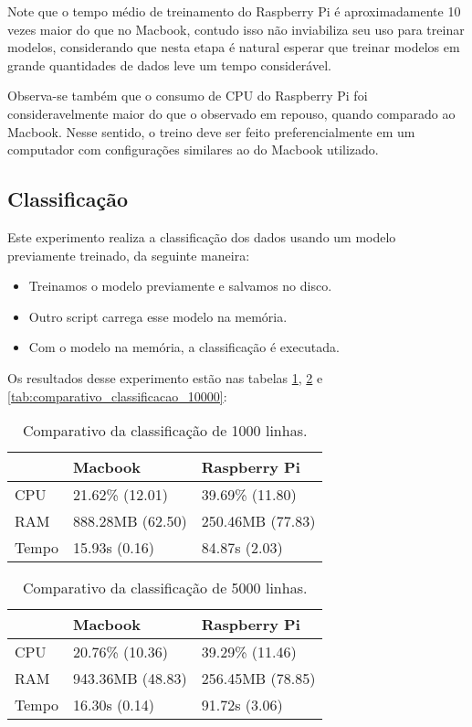 Note que o tempo médio de treinamento do Raspberry Pi é aproximadamente 10 vezes maior do que no Macbook,
contudo isso não inviabiliza seu uso para treinar modelos, considerando que nesta etapa é natural
esperar que treinar modelos em grande quantidades de dados leve um tempo considerável.

Observa-se também que o consumo de CPU do Raspberry Pi foi consideravelmente maior do que o observado 
em repouso, quando comparado ao Macbook. Nesse sentido, o treino deve ser feito preferencialmente 
em um computador com configurações similares ao do Macbook utilizado.


\subsection{Classificação}

Este experimento realiza a classificação dos dados usando um modelo previamente treinado, 
da seguinte maneira:

\begin{itemize}
    \item Treinamos o modelo previamente e salvamos no disco.
    \item Outro script carrega esse modelo na memória. 
    \item Com o modelo na memória, a classificação é executada.
\end{itemize}


Os resultados desse experimento estão nas tabelas \ref{tab:comparativo_classificacao_1000}, 
\ref{tab:comparativo_classificacao_5000} e \ref{tab:comparativo_classificacao_10000}:


\begin{table}[!ht]
    \centering
    \begin{tabular}{|l|l|l|}
    \hline
        ~ & Macbook & Raspberry Pi \\ \hline
        CPU & 21.62\% (12.01) & 39.69\% (11.80) \\ \hline
        RAM & 888.28MB (62.50) & 250.46MB (77.83) \\ \hline
        Tempo & 15.93s (0.16) & 84.87s (2.03) \\ \hline
    \end{tabular}

    \caption{Comparativo da classificação de 1000 linhas.\label{tab:comparativo_classificacao_1000}}
\end{table}


\begin{table}[!ht]
    \centering
    \begin{tabular}{|l|l|l|}
    \hline
        ~ & Macbook & Raspberry Pi \\ \hline
        CPU & 20.76\% (10.36) & 39.29\% (11.46) \\ \hline
        RAM & 943.36MB (48.83) & 256.45MB (78.85) \\ \hline
        Tempo & 16.30s (0.14) & 91.72s (3.06) \\ \hline
    \end{tabular}

    \caption{Comparativo da classificação de 5000 linhas.\label{tab:comparativo_classificacao_5000}}
\end{table}


